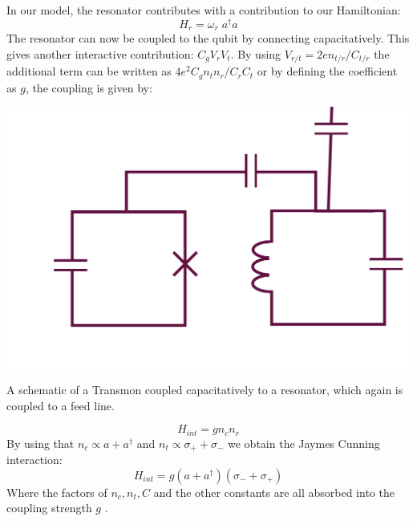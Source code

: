 In our model, the resonator contributes with a contribution to our Hamiltonian:
\begin{equation}
    H_r = \omega_r \; a^\dagger a
\end{equation}
The resonator can now be coupled to the qubit by connecting capacitatively. This gives another interactive contribution: $C_g V_r V_t$. By using $V_{r/t} = 2e n_{t/r} / C_{t/r}$ the additional term can be written as $4e^2C_g  n_t n_r / C_r C_t$ or by defining the coefficient as $g$, the coupling is given by:
\begin{marginfigure}
    \centering
    \includegraphics{Figs/Sections/computations_and_readout/qubit_resonator_feedline.png}
    \caption{A schematic of a Transmon coupled capacitatively to a resonator, which again is coupled to a feed line.}
    \label{fig:schematic_qubit_res}
\end{marginfigure}
\begin{equation}
    H_{int} = g n_c n_r 
\end{equation}
By using that $n_c \propto a + a^\dagger$ and $n_t \propto \sigma_+ + \sigma_-$ we obtain the Jaymes Cunning interaction:
\begin{equation}\label{eq:full_interaction_term}
    H_{int} = g (a + a^\dagger) (\sigma_- + \sigma_+)
\end{equation}
Where the factors of $n_c, n_t, C$ and the other constants are all absorbed into the coupling strength $g$ \cite{krantz_quantum_2019}. 



